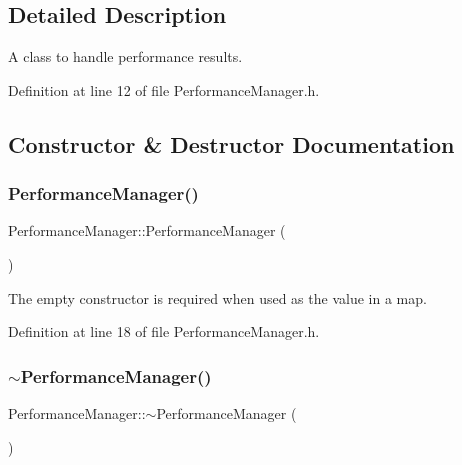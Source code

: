 \subsection{Detailed Description}
A class to handle performance results. 

Definition at line 12 of file Performance\+Manager.\+h.



\subsection{Constructor \& Destructor Documentation}
\mbox{\label{class_performance_manager_ab9e6bcde7a6a29b4b791300805e3774d}} 
\subsubsection{\texorpdfstring{Performance\+Manager()}{PerformanceManager()}}
{\footnotesize\ttfamily Performance\+Manager\+::\+Performance\+Manager (\begin{DoxyParamCaption}{ }\end{DoxyParamCaption})\hspace{0.3cm}{\ttfamily [inline]}}

The empty constructor is required when used as the value in a map. 

Definition at line 18 of file Performance\+Manager.\+h.

\mbox{\label{class_performance_manager_a4cdbf108ea6a7cdad618144c3c7a287c}} 
\subsubsection{\texorpdfstring{$\sim$\+Performance\+Manager()}{~PerformanceManager()}}
{\footnotesize\ttfamily Performance\+Manager\+::$\sim$\+Performance\+Manager (\begin{DoxyParamCaption}{ }\end{DoxyParamCaption})}



